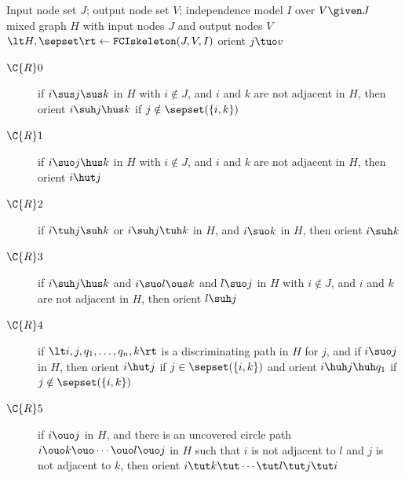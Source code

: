 \begin{algorithm}
\begin{algorithmic}[1]
  \Input Input node set $J$; output node set $V$; independence model $I$ over $V \given J$
  \Output mixed graph $H$ with input nodes $J$ and output nodes $V$
  \State $\lt H,\sepset \rt \leftarrow \mathtt{FCIskeleton}(J,V,I)$\label{alg:fci:skeleton}
  \label{alg:fci:orientJ}\label{alg:fci:start_orient}
    \State orient $j \tuo v$
  \EndFor
  \Repeat \label{alg:fci:R0}
    \begin{description}
      \item[$\C{R}0$] if $i \sus j \sus k$ in $H$ with $i \notin J$, and $i$ and $k$ are not adjacent in $H$, then orient $i \suh j \hus k$ if $j \notin \sepset(\{i,k\})$ %
    \end{description}
  \Repeat
    \begin{description}
      \item[$\C{R}1$] if $i \suo j \hus k$ in $H$ with $i \notin J$, and $i$ and $k$ are not adjacent in $H$, then orient $i \hut j$
      \item[$\C{R}2$] if $i \tuh j \suh k$ or $i \suh j \tuh k$ in $H$, and $i \suo k$ in $H$, then orient $i \suh k$
      \item[$\C{R}3$] if $i \suh j \hus k$ and $i \suo l \ous k$ and $l \suo j$ in $H$ with $i \notin J$, and $i$ and $k$ are not adjacent in $H$, then orient $l \suh j$
      \item[$\C{R}4$] if $\lt i, j, q_1, \dots, q_n, k \rt$ is a discriminating path in $H$ for $j$, and if $i \suo j$ in $H$, then orient $i \hut j$ if $j \in \sepset(\{i,k\})$ and orient $i \huh j \huh q_1$ if $j \notin \sepset(\{i,k\})$ %
    \end{description}
  \Repeat
    \begin{description}
      \item[$\C{R}5$] if $i \ouo j$ in $H$, and there is an uncovered circle path $i \ouo k \ouo \cdots \ouo l \ouo j$ in $H$ such that $i$ is not adjacent to $l$ and $j$ is not adjacent to $k$, then orient $i \tut k \tut \cdots \tut l \tut j \tut i$

\end{description}
\end{algorithmic}
\end{algorithm}
